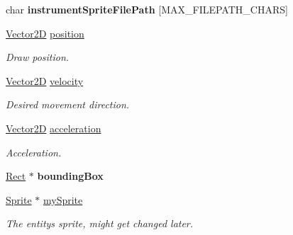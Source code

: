 \begin{DoxyCompactItemize}
\mbox{\label{structentity__s_a79768ccb2828c016e7f22756e6b8cb2a}} 
char {\bfseries instrument\+Sprite\+File\+Path} \mbox{[}M\+A\+X\+\_\+\+F\+I\+L\+E\+P\+A\+T\+H\+\_\+\+C\+H\+A\+RS\mbox{]}
\item 
\mbox{\label{structentity__s_a563df82e5b0baef681ea2fddeee6a0b3}} 
\hyperlink{struct_vector2_d}{Vector2D} \hyperlink{structentity__s_a563df82e5b0baef681ea2fddeee6a0b3}{position}
\begin{DoxyCompactList}\small\item\em Draw position. \end{DoxyCompactList}\item 
\mbox{\label{structentity__s_a0af6fba0533a87355ce3f5a80732c9d5}} 
\hyperlink{struct_vector2_d}{Vector2D} \hyperlink{structentity__s_a0af6fba0533a87355ce3f5a80732c9d5}{velocity}
\begin{DoxyCompactList}\small\item\em Desired movement direction. \end{DoxyCompactList}\item 
\mbox{\label{structentity__s_ac3e41bdee60d6b8af992de0fe2bca35d}} 
\hyperlink{struct_vector2_d}{Vector2D} \hyperlink{structentity__s_ac3e41bdee60d6b8af992de0fe2bca35d}{acceleration}
\begin{DoxyCompactList}\small\item\em Acceleration. \end{DoxyCompactList}\item 
\mbox{\label{structentity__s_afb450af644fe028e2a952aa35aa28241}} 
\hyperlink{structrect__s}{Rect} $\ast$ {\bfseries bounding\+Box}
\item 
\mbox{\label{structentity__s_a902a6ba59063b8b86dfcd77edb7edb00}} 
\hyperlink{struct_sprite___s}{Sprite} $\ast$ \hyperlink{structentity__s_a902a6ba59063b8b86dfcd77edb7edb00}{my\+Sprite}
\begin{DoxyCompactList}\small\item\em The entity\textquotesingle{}s sprite, might get changed later. \end{DoxyCompactList}\item 
\mbox{\label{structentity__s_a9bb7d1a12c06b6cb82ee526b976bf44a}} 

\end{DoxyCompactItemize}
